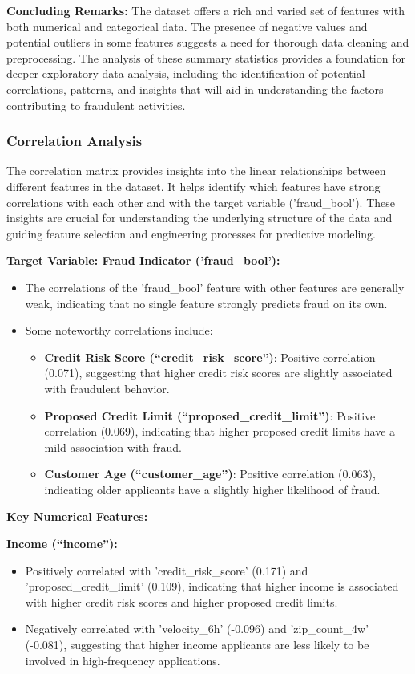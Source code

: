 \documentclass[12pt,a4paper]{report}
\begin{document}
\textbf{Concluding Remarks:}
The dataset offers a rich and varied set of features with both numerical and categorical data. The presence of negative values and potential outliers in some features suggests a need for thorough data cleaning and preprocessing. The analysis of these summary statistics provides a foundation for deeper exploratory data analysis, including the identification of potential correlations, patterns, and insights that will aid in understanding the factors contributing to fraudulent activities.

\subsubsection{Correlation Analysis}

The correlation matrix provides insights into the linear relationships between different features in the dataset. It helps identify which features have strong correlations with each other and with the target variable ('fraud\_bool'). These insights are crucial for understanding the underlying structure of the data and guiding feature selection and engineering processes for predictive modeling.

\textbf{Target Variable: Fraud Indicator ('fraud\_bool'):}
\begin{itemize}
    \item The correlations of the 'fraud\_bool' feature with other features are generally weak, indicating that no single feature strongly predicts fraud on its own.
    \item Some noteworthy correlations include:
    \begin{itemize}
        \item \textbf{Credit Risk Score (``credit\_risk\_score'')}: Positive correlation (0.071), suggesting that higher credit risk scores are slightly associated with fraudulent behavior.
        \item \textbf{Proposed Credit Limit (``proposed\_credit\_limit'')}: Positive correlation (0.069), indicating that higher proposed credit limits have a mild association with fraud.
        \item \textbf{Customer Age (``customer\_age'')}: Positive correlation (0.063), indicating older applicants have a slightly higher likelihood of fraud.
    \end{itemize}
\end{itemize}

\textbf{Key Numerical Features:}

\textbf{Income (``income''):}
\begin{itemize}
    \item Positively correlated with 'credit\_risk\_score' (0.171) and 'proposed\_credit\_limit' (0.109), indicating that higher income is associated with higher credit risk scores and higher proposed credit limits.
    \item Negatively correlated with 'velocity\_6h' (-0.096) and 'zip\_count\_4w' (-0.081), suggesting that higher income applicants are less likely to be involved in high-frequency applications.
\end{itemize}
\end{document}
